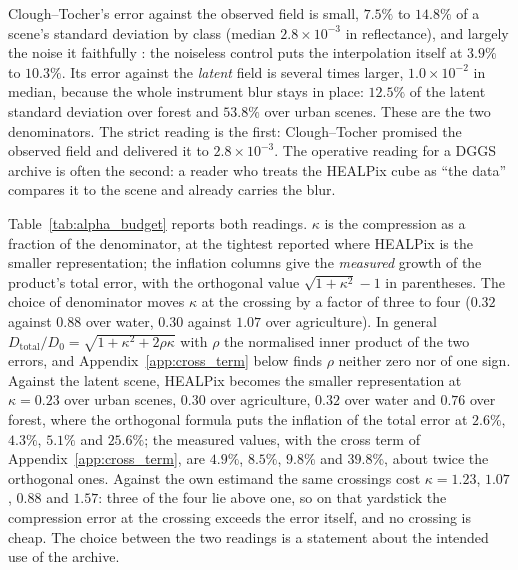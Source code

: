 Clough--Tocher's error against the observed field is small, $7.5\%$ to
$14.8\%$ of a scene's standard deviation by class (median
$2.8\times10^{-3}$ in reflectance), and largely the noise it faithfully
: the noiseless control puts the interpolation itself at
$3.9\%$ to $10.3\%$. Its error against the \emph{latent} field is
several times larger, $1.0\times10^{-2}$ in median, because the whole
instrument blur stays in place: $12.5\%$ of the latent standard
deviation over forest and $53.8\%$ over urban scenes. These are the two
denominators. The strict reading is the first: Clough--Tocher promised
the observed field and delivered it to $2.8\times10^{-3}$. The
operative reading for a DGGS
archive is often the second: a reader who treats the HEALPix
cube as ``the data'' compares it to the scene and already carries the
blur.

Table~\ref{tab:alpha_budget} reports both readings. $\kappa$ is the
compression  as a fraction of the denominator, at the tightest
reported  where HEALPix is the smaller representation; the
inflation columns give the \emph{measured} growth of the product's total
error, with the orthogonal value $\sqrt{1+\kappa^2}-1$ in parentheses.
The choice of denominator moves $\kappa$ at the crossing by a factor of
three to four ($0.32$ against $0.88$ over water, $0.30$ against $1.07$
over agriculture). In general
$D_{\mathrm{total}}/D_0=\sqrt{1+\kappa^2+2\rho\kappa}$ with $\rho$ the
normalised inner product of the two errors, and
Appendix~\ref{app:cross_term} below finds $\rho$ neither zero nor of one
sign.
Against the latent scene, HEALPix becomes the smaller representation at
$\kappa=0.23$ over urban scenes, $0.30$ over agriculture, $0.32$ over
water and $0.76$ over forest, where the orthogonal formula puts the
inflation of the total error at $2.6\%$, $4.3\%$, $5.1\%$ and
$25.6\%$; the measured values, with the cross term of
Appendix~\ref{app:cross_term}, are $4.9\%$, $8.5\%$, $9.8\%$ and
$39.8\%$, about twice the orthogonal ones. Against the own estimand the
same crossings cost $\kappa=1.23$, $1.07$, $0.88$ and $1.57$: three of
the four lie above one, so on that yardstick the compression error at the
crossing exceeds the  error itself, and no crossing is cheap.
The choice between the two readings is a statement about the intended
use of the archive.



